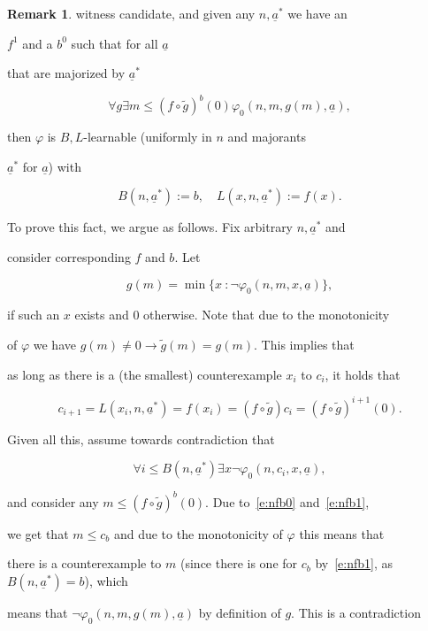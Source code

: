 \documentclass[1p]{elsarticle}
\newcommand{\be}[1][{e:\arabic{equation}}] { \begin{equation}\label{#1} }
\newcommand{\ee} { \end{equation} }
\newcommand{\tup}{\underline} %
\theoremstyle{plain}
\theoremstyle{definition}
\newtheorem{rmk}[thm]{Remark}
\theoremstyle{remark}
\renewcommand{\phi}{\varphi}
\theoremstyle{definition}
\begin{document}
{\begin{rmk}
witness candidate, and given any $n,\tup a^*$ we have an 

$f^1$ and a $b^0$ such that for all $\underline{a}$ 

that are majorized by $\underline{a}^*$ 

\be[e:nfbA]

\forall g \exists m \leq (f\circ \tilde{g})^b(0) \phi_0(n,m,g(m),\tup a),

\ee

then $\phi$ is $B,L$-learnable (uniformly in $n$ and majorants 

$\underline{a}^*$ for $\underline{a}$) with

\[

B(n,\tup a^*):=b,\quad L(x,n,\tup a^*):=f(x).

\]

To prove this fact, we argue as follows. Fix arbitrary $n,\tup a^*$ and

consider corresponding $f$ and $b$. Let

\[

g(m)=\min\{x\ : \neg\phi_0(n,m,x,\tup a) \},

\]

if such an $x$ exists and $0$ otherwise. Note that due to the monotonicity

of $\phi$ we have $g(m)\neq0\rightarrow \tilde g(m)=g(m)$. This implies that

as long as there is a (the smallest) counterexample $x_i$ to $c_i$, it holds that

\be[e:nfb0]

c_{i+1}=L(x_i,n,\tup a^*)=f(x_i)

=(f\circ \tilde g)c_i=(f\circ \tilde g)^{i+1}(0).

\ee

Given all this, assume towards contradiction that

\be[e:nfb1]

\forall i\leq B(n,\tup a^*) \exists x \neg\phi_0(n,c_i,x,\tup a),

\ee

and consider any $m\leq (f\circ \tilde{g})^b(0)$. Due to~\eqref{e:nfb0} and~\eqref{e:nfb1},

we get that $m\leq c_b$ and due to the monotonicity of $\phi$ this means that

there is a counterexample to $m$ (since there is one for $c_b$ by~\eqref{e:nfb1}, as $B(n,\tup a^*)=b$), which 

means that $\neg\phi_0(n,m,g(m),\tup a)$ by definition of $g$. This is a contradiction


\end{rmk}}
\end{document}
